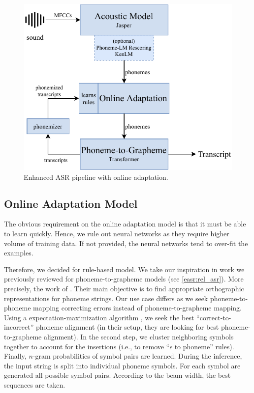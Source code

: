 \begin{figure}[t]
	\centering
	\includegraphics[width=.9\textwidth]{img/online_easr}
	\caption{Enhanced ASR pipeline with online adaptation.}
	\label{fig:online_easr}
\end{figure} 


\subsection{Online Adaptation Model}
The obvious requirement on the online adaptation model is that it must be able to learn quickly. Hence, we rule out neural networks as they require higher volume of training data. If not provided, the neural networks tend to over-fit the examples. 

Therefore, we decided for rule-based model. We take our inspiration in work we previously reviewed for phoneme-to-grapheme models (see \cref{easr:rel_asr}). More precisely, the work of . Their main objective is to find appropriate orthographic representations for phoneme strings. Our use case differs as we seek phoneme-to-phoneme mapping correcting errors instead of phoneme-to-grapheme mapping. Using a expectation-maximization algorithm , we seek the best ``correct-to-incorrect'' phoneme alignment (in their setup, they are looking for best phoneme-to-grapheme alignment). In the second step, we cluster neighboring symbols together to account for the insertions (i.e., to remove ``$\epsilon$ to phoneme'' rules). Finally, $n$-gram probabilities of symbol pairs are learned. During the inference, the input string is split into individual phoneme symbols. For each symbol are generated all possible symbol pairs. According to the beam width, the best sequences are taken. 

